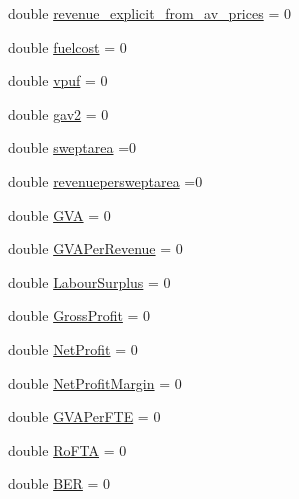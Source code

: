 \begin{DoxyCompactItemize}
\item 
double \mbox{\hyperlink{structdisplace_1_1ipc_1_1_vessel_logbook_message_a6242180f85af95167e62c60aa16926fa}{revenue\+\_\+explicit\+\_\+from\+\_\+av\+\_\+prices}} = 0
\item 
double \mbox{\hyperlink{structdisplace_1_1ipc_1_1_vessel_logbook_message_a8f1305b169302ed9afb19a0e0c239a47}{fuelcost}} = 0
\item 
double \mbox{\hyperlink{structdisplace_1_1ipc_1_1_vessel_logbook_message_ac8302b55e2852a6097cf9183fef94f14}{vpuf}} = 0
\item 
double \mbox{\hyperlink{structdisplace_1_1ipc_1_1_vessel_logbook_message_aa6da6ddaa5a2244a9ae468e60b8403a1}{gav2}} = 0
\item 
double \mbox{\hyperlink{structdisplace_1_1ipc_1_1_vessel_logbook_message_ab9ef4b5dac9fc700dcab9b7b0d47d1cb}{sweptarea}} =0
\item 
double \mbox{\hyperlink{structdisplace_1_1ipc_1_1_vessel_logbook_message_ab6688910949117f8541e0fdbff0c3462}{revenuepersweptarea}} =0
\item 
double \mbox{\hyperlink{structdisplace_1_1ipc_1_1_vessel_logbook_message_a4b43ea190c5601246998581f1fff67ec}{G\+VA}} = 0
\item 
double \mbox{\hyperlink{structdisplace_1_1ipc_1_1_vessel_logbook_message_ac929c5e1fe0b625cce49b54b9054c8ea}{G\+V\+A\+Per\+Revenue}} = 0
\item 
double \mbox{\hyperlink{structdisplace_1_1ipc_1_1_vessel_logbook_message_a74a3e802addd096d441e4f4965df5028}{Labour\+Surplus}} = 0
\item 
double \mbox{\hyperlink{structdisplace_1_1ipc_1_1_vessel_logbook_message_a41976f16ca050e609d07397abd8b5baf}{Gross\+Profit}} = 0
\item 
double \mbox{\hyperlink{structdisplace_1_1ipc_1_1_vessel_logbook_message_a7163510e7e4ddb9d9917b4e717b3e341}{Net\+Profit}} = 0
\item 
double \mbox{\hyperlink{structdisplace_1_1ipc_1_1_vessel_logbook_message_a3dc4e775a0502f8c735f30ac93541b81}{Net\+Profit\+Margin}} = 0
\item 
double \mbox{\hyperlink{structdisplace_1_1ipc_1_1_vessel_logbook_message_af53eb9845ba4e06ffaa783c75097eb9b}{G\+V\+A\+Per\+F\+TE}} = 0
\item 
double \mbox{\hyperlink{structdisplace_1_1ipc_1_1_vessel_logbook_message_abc0cf146545701493cd75a122d891ad8}{Ro\+F\+TA}} = 0
\item 
double \mbox{\hyperlink{structdisplace_1_1ipc_1_1_vessel_logbook_message_af29a39e7728639252263e5fb14e3a406}{B\+ER}} = 0

\end{DoxyCompactItemize}
